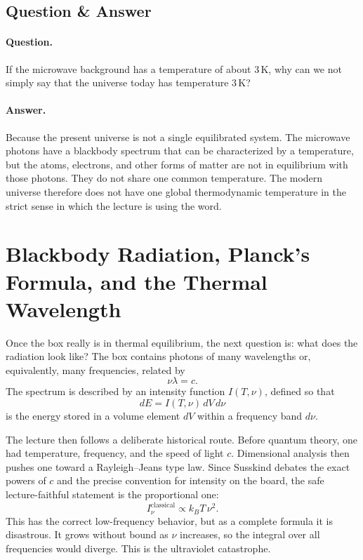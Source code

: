 \subsection{Question \& Answer}

\paragraph{Question.} If the microwave background has a temperature of about \(3\,\mathrm{K}\), why can we not simply say that the universe today has temperature \(3\,\mathrm{K}\)?

\paragraph{Answer.} Because the present universe is not a single equilibrated system. The microwave photons have a blackbody spectrum that can be characterized by a temperature, but the atoms, electrons, and other forms of matter are not in equilibrium with those photons. They do not share one common temperature. The modern universe therefore does not have one global thermodynamic temperature in the strict sense in which the lecture is using the word.

\section{Blackbody Radiation, Planck's Formula, and the Thermal Wavelength}

Once the box really is in thermal equilibrium, the next question is: what does the radiation look like? The box contains photons of many wavelengths or, equivalently, many frequencies, related by
\begin{equation}
\nu \lambda = c.
\end{equation}
The spectrum is described by an intensity function \(I(T,\nu)\), defined so that
\begin{equation}
dE = I(T,\nu)\, dV\, d\nu
\end{equation}
is the energy stored in a volume element \(dV\) within a frequency band \(d\nu\).

The lecture then follows a deliberate historical route. Before quantum theory, one had temperature, frequency, and the speed of light \(c\). Dimensional analysis then pushes one toward a Rayleigh--Jeans type law. Since Susskind debates the exact powers of \(c\) and the precise convention for intensity on the board, the safe lecture-faithful statement is the proportional one:
\begin{equation}
I_\nu^{\mathrm{classical}} \propto k_B T\, \nu^2.
\end{equation}
This has the correct low-frequency behavior, but as a complete formula it is disastrous. It grows without bound as \(\nu\) increases, so the integral over all frequencies would diverge. This is the ultraviolet catastrophe.


